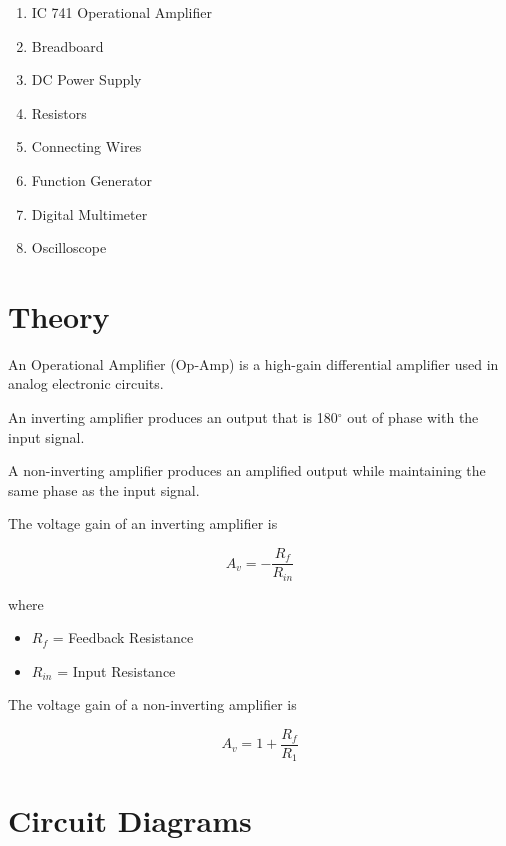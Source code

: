 \documentclass[12pt,a4paper]{report}
\begin{document}
\begin{enumerate}

\item IC 741 Operational Amplifier

\item Breadboard

\item DC Power Supply

\item Resistors

\item Connecting Wires

\item Function Generator

\item Digital Multimeter

\item Oscilloscope

\end{enumerate}

\section{Theory}

An Operational Amplifier (Op-Amp) is a high-gain differential amplifier used in analog electronic circuits.

An inverting amplifier produces an output that is 180$^\circ$ out of phase with the input signal.

A non-inverting amplifier produces an amplified output while maintaining the same phase as the input signal.

The voltage gain of an inverting amplifier is

\[
A_v=-\frac{R_f}{R_{in}}
\]

where

\begin{itemize}

\item $R_f$ = Feedback Resistance

\item $R_{in}$ = Input Resistance

\end{itemize}

The voltage gain of a non-inverting amplifier is

\[
A_v=1+\frac{R_f}{R_1}
\]

\section{Circuit Diagrams}
\end{document}
